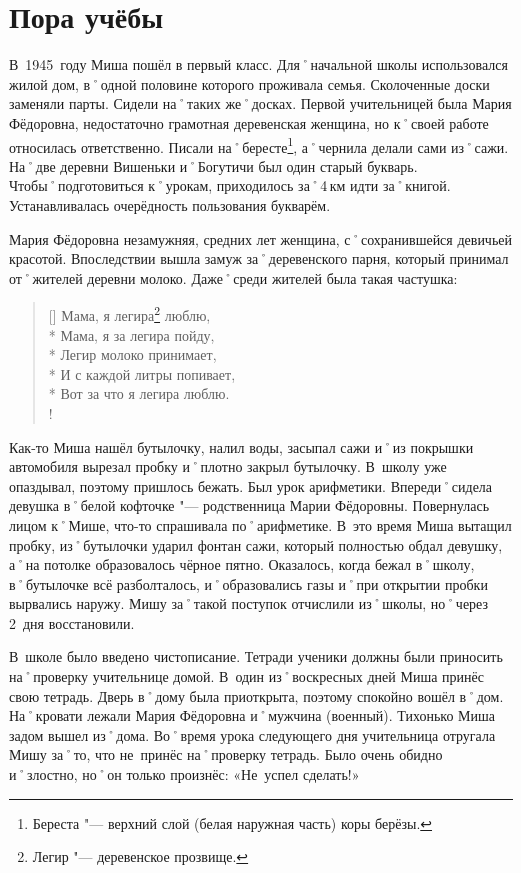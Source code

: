 ﻿\chapter{Пора учёбы}
В~1945~году Миша пошёл в первый класс. Для˚начальной школы использовался жилой дом, в˚одной половине которого проживала семья. Сколоченные доски заменяли парты. Сидели на˚таких же˚досках. Первой учительницей была Мария Фёдоровна, недостаточно грамотная деревенская женщина, но к˚своей работе относилась ответственно. Писали на˚бересте\footnote{Береста "--- верхний слой (белая наружная часть) коры берёзы.}, а˚чернила делали сами из˚сажи. На˚две деревни Вишеньки и˚Богутичи был один старый букварь. Чтобы˚подготовиться к˚урокам, приходилось за˚4\,км идти за˚книгой. Устанавливалась очерёдность пользования букварём.

Мария Фёдоровна незамужняя, средних лет женщина, с˚сохранившейся девичьей красотой. Впоследствии вышла замуж за˚деревенского парня, который принимал от˚жителей деревни молоко. Даже˚среди жителей была такая частушка:

\settowidth{\versewidth}{Легир молоко принимает,}		%
\begin{verse}[\versewidth]
	Мама, я легира\footnote{Легир "--- деревенское прозвище.}  люблю, \\* 
	Мама, я за легира пойду, \\*	
	Легир молоко принимает, \\*
	И с каждой литры попивает, \\*
	Вот за что я легира люблю. \\!
\end{verse}

Как-то Миша нашёл бутылочку, налил воды, засыпал сажи и˚из покрышки автомобиля вырезал пробку и˚плотно закрыл бутылочку. В~школу уже опаздывал, поэтому пришлось бежать. Был урок арифметики. Впереди˚сидела девушка в˚белой кофточке "--- родственница Марии Фёдоровны. Повернулась лицом к˚Мише, что-то спрашивала по˚арифметике. В~это время Миша вытащил пробку, из˚бутылочки ударил фонтан сажи, который полностью обдал девушку, а˚на потолке образовалось чёрное пятно. Оказалось, когда бежал в˚школу, в˚бутылочке всё разболталось, и˚образовались газы и˚при открытии пробки вырвались наружу. Мишу за˚такой поступок отчислили из˚школы, но˚через 2~дня восстановили.

В~школе было введено чистописание. Тетради ученики должны были приносить на˚проверку учительнице домой. В~один из˚воскресных дней Миша принёс свою тетрадь. Дверь в˚дому была приоткрыта, поэтому спокойно вошёл в˚дом. На˚кровати лежали Мария Фёдоровна и˚мужчина (военный). Тихонько Миша задом вышел из˚дома. Во˚время урока следующего дня учительница отругала Мишу за˚то, что не~принёс на˚проверку тетрадь. Было очень обидно и˚злостно, но˚он только произнёс: «Не~успел сделать!»

